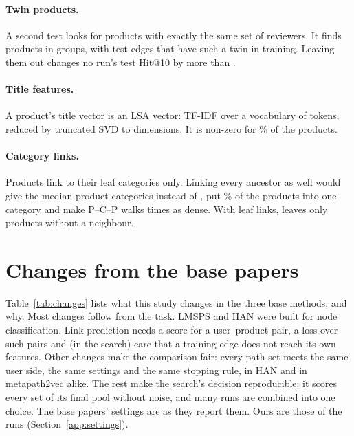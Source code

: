 \paragraph{Twin products.} A second test looks for products with exactly the same set of
reviewers. It finds  products in  groups, with  test
edges that have such a twin in training. Leaving them out changes no run's test Hit@10 by more than
.

\paragraph{Title features.} A product's title vector is an LSA vector: TF-IDF over a vocabulary of
 tokens, reduced by truncated SVD to  dimensions. It is non-zero for
\% of the products.

\paragraph{Category links.} Products link to their leaf categories only. Linking every ancestor as
well would give the median product  categories instead of
, put \% of the products into one category and make
P--C--P walks  times as dense. With leaf links,  leaves only
 products without a neighbour.



\section{Changes from the base papers}
\label{app:changes}

Table~\ref{tab:changes} lists what this study changes in the three base methods, and why. Most
changes follow from the task. LMSPS and HAN were built for node classification. Link prediction
needs a score for a user--product pair, a loss over such pairs and (in the search) care that a
training edge does not reach its own features. Other changes make the comparison fair: every path
set meets the same user side, the same settings and the same stopping rule, in HAN and in
metapath2vec alike. The rest make the search's decision reproducible: it scores every set of its
final pool without noise, and many runs are combined into one choice. The base papers' settings
are as they report them. Ours are those of the runs (Section~\ref{app:settings}).

